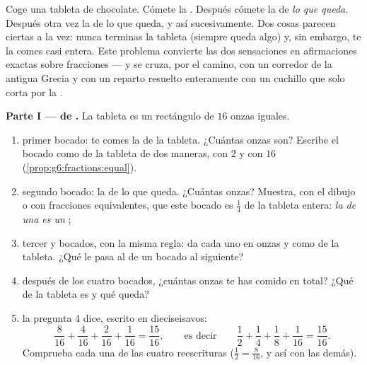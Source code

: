 \begin{problem}
\label{pb:g6:fractions:1}
Coge una tableta de chocolate. Cómete la . Después cómete la  de \emph{lo
que queda}. Después otra vez la  de lo que queda, y así sucesivamente. Dos cosas
parecen ciertas a la vez: nunca terminas la tableta (siempre queda
algo) y, sin embargo, te la comes casi entera. Este problema convierte las dos
sensaciones en afirmaciones exactas sobre fracciones --- y se cruza, por
el camino, con un corredor de la antigua Grecia y con un reparto resuelto
enteramente con un cuchillo que solo corta por la .

\medskip
\noindent\textbf{Parte I ---  de .}
La tableta es un rectángulo de $16$ onzas iguales.
\begin{enumerate}
  \item primer bocado: te comes la  de la tableta. ¿Cuántas onzas
        son? Escribe el bocado como  de la tableta de dos maneras,
        con  $2$ y con  $16$
        (\cref{prop:g6:fractions:equal}).
  \item segundo bocado: la  de lo que queda. ¿Cuántas onzas? Muestra,
        con el dibujo o con fracciones equivalentes, que este
        bocado es $\frac14$ de la tableta entera: \emph{la  de una 
        es un };
  \item tercer y  bocados, con la misma regla: da cada uno en
        onzas y como  de la tableta. ¿Qué le pasa al
         de un bocado al siguiente?
  \item después de los cuatro bocados, ¿cuántas onzas te has comido en
        total? ¿Qué  de la tableta es y qué 
        queda?
  \item la pregunta 4 dice, escrito en dieciseisavos:
        \[
        \frac{8}{16} + \frac{4}{16} + \frac{2}{16} + \frac{1}{16}
        = \frac{15}{16},
        \qquad\text{es decir}\qquad
        \frac12 + \frac14 + \frac18 + \frac{1}{16}
        = \frac{15}{16} .
        \]
        Comprueba cada una de las cuatro reescrituras
        ($\frac12 = \frac{8}{16}$, y así con las demás).
\end{enumerate}


\end{problem}

